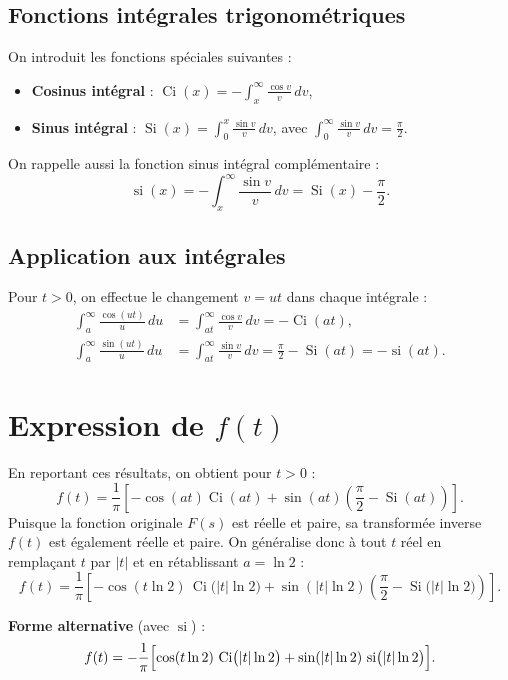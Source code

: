 \documentclass[12pt,a4paper]{article}
\begin{document}
\subsection{Fonctions intégrales trigonométriques}
On introduit les fonctions spéciales suivantes :
\begin{itemize}[label=--]
    \item \textbf{Cosinus intégral} : $\displaystyle \operatorname{Ci}(x) = -\int_{x}^{\infty} \frac{\cos v}{v} \, dv$,
    \item \textbf{Sinus intégral} : $\displaystyle \operatorname{Si}(x) = \int_{0}^{x} \frac{\sin v}{v} \, dv$, avec
    $\displaystyle \int_{0}^{\infty} \frac{\sin v}{v} \, dv = \frac{\pi}{2}$.
\end{itemize}
On rappelle aussi la fonction sinus intégral complémentaire :
\[
\operatorname{si}(x) = -\int_{x}^{\infty} \frac{\sin v}{v} \, dv = \operatorname{Si}(x) - \frac{\pi}{2}.
\]

\subsection{Application aux intégrales}
Pour $t > 0$, on effectue le changement $v = ut$ dans chaque intégrale :
\begin{align*}
\int_{a}^{\infty} \frac{\cos(ut)}{u} \, du &= \int_{at}^{\infty} \frac{\cos v}{v} \, dv = -\operatorname{Ci}(at), \\
\int_{a}^{\infty} \frac{\sin(ut)}{u} \, du &= \int_{at}^{\infty} \frac{\sin v}{v} \, dv = \frac{\pi}{2} - \operatorname{Si}(at) = -\operatorname{si}(at).
\end{align*}

\section{Expression de $f(t)$}
En reportant ces résultats, on obtient pour $t > 0$ :
\[
f(t) = \frac{1}{\pi}\left[ -\cos(at)\operatorname{Ci}(at) + \sin(at)\left( \frac{\pi}{2} - \operatorname{Si}(at) \right) \right].
\]
Puisque la fonction originale $F(s)$ est réelle et paire, sa transformée inverse $f(t)$ est également réelle et paire. On généralise donc à tout $t$ réel en remplaçant $t$ par $|t|$ et en rétablissant $a = \ln 2$ :
\[
\boxed{ f(t) = \frac{1}{\pi}\left[ -\cos(t \ln 2)\,\operatorname{Ci}\!\big(|t|\ln 2\big) 
        + \sin(|t|\ln 2)\left( \frac{\pi}{2} - \operatorname{Si}\!\big(|t|\ln 2\big) \right) \right] }.
\]

\textbf{Forme alternative} (avec $\operatorname{si}$) :
\[
f(t) = -\frac{1}{\pi}\Bigl[ \cos(t \ln 2)\,\operatorname{Ci}\!\big(|t|\ln 2\bigr) 
        + \sin(|t|\ln 2)\,\operatorname{si}\!\big(|t|\ln 2\bigr) \Bigr].
\]
\end{document}
